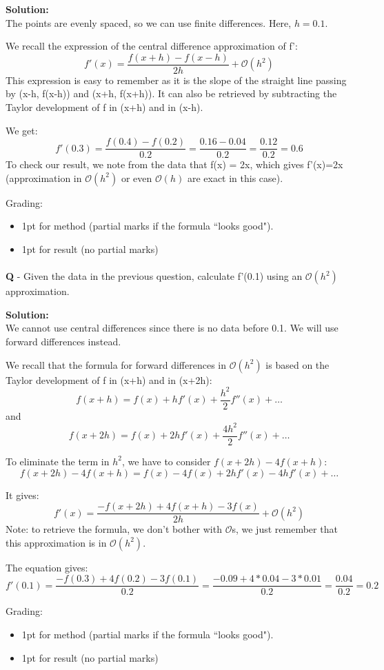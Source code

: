\documentclass{llncs}
\newcounter{ques}
\renewcommand{\question}[1]{\paragraph{}\textbf{Q\theques} - #1\stepcounter{ques} }
\newcommand{\answer}[1]{\color{red}\textbf{Solution:}\\#1\color{black}}
\begin{document}
\answer{
The points are evenly spaced, so we can use finite differences. Here, $h=0.1$.

We recall the expression of the central difference approximation of f':
$$
f'(x) = \frac{f(x+h)-f(x-h)}{2h} + \mathcal{O}(h^2)
$$
This expression is easy to remember as it is the slope of the straight line
passing by (x-h, f(x-h)) and (x+h, f(x+h)). It can also be retrieved by subtracting the
Taylor development of f in (x+h) and in (x-h).

We get:
$$
f'(0.3) = \frac{f(0.4)-f(0.2)}{0.2} = \frac{0.16 - 0.04}{0.2} = \frac{0.12}{0.2} = 0.6
$$
To check our result, we note from the data that f(x) = 2x, which gives 
f'(x)=2x (approximation in $\mathcal{O}(h^2)$ or even $\mathcal{O}(h)$ 
are exact in this case). 


Grading:
\begin{itemize}
\item 1pt for method (partial marks if the formula ``looks good").
\item 1pt for result (no partial marks)
\end{itemize}
}

\newpage
\question{Given the data in the previous question, calculate f'(0.1) using an
$\mathcal{O}(h^2)$ approximation.
}

\answer{
We cannot use central differences since there is no data before 0.1. We will use
forward differences instead.

We recall that the formula for forward differences in $\mathcal{O}(h^2)$
is based on the Taylor development of f in (x+h) and in (x+2h):
$$
f(x+h) = f(x) + hf'(x) + \frac{h^2}{2}f''(x) + \ldots
$$
and
$$
f(x+2h) = f(x) + 2hf'(x) + \frac{4h^2}{2}f''(x) + \ldots
$$

To eliminate the term in $h^2$, we have to consider $f(x+2h)-4f(x+h)$:
$$
f(x+2h) - 4f(x+h) = f(x) - 4f(x) + 2hf'(x) - 4hf'(x) + \ldots
$$

It gives:
$$
f'(x) = \frac{-f(x+2h)+4f(x+h)-3f(x)}{2h} + \mathcal{O}(h^2)
$$
Note: to retrieve the formula, we don't bother with $\mathcal{O}$s, we just 
remember that this approximation is in $\mathcal{O}(h^2)$. 

The equation gives:
$$
f'(0.1) = \frac{-f(0.3)+4f(0.2)-3f(0.1)}{0.2} = \frac{-0.09 + 4*0.04 - 3*0.01}{0.2} = \frac{0.04}{0.2} = 0.2
$$

Grading:
\begin{itemize}
\item 1pt for method (partial marks if the formula ``looks good").
\item 1pt for result (no partial marks)
\end{itemize}
}
\end{document}
